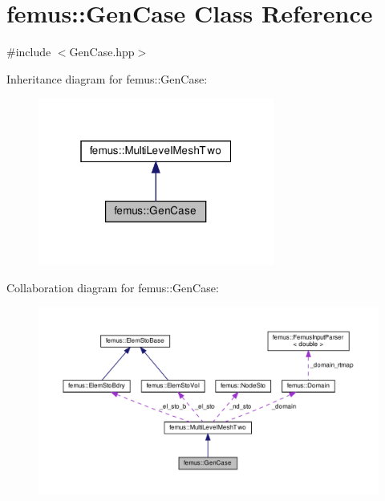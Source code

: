 \hypertarget{classfemus_1_1_gen_case}{}\section{femus\+:\+:Gen\+Case Class Reference}
\label{classfemus_1_1_gen_case}


{\ttfamily \#include $<$Gen\+Case.\+hpp$>$}



Inheritance diagram for femus\+:\+:Gen\+Case\+:
\nopagebreak
\begin{figure}[H]
\begin{center}
\leavevmode
\includegraphics[width=220pt]{classfemus_1_1_gen_case__inherit__graph}
\end{center}
\end{figure}


Collaboration diagram for femus\+:\+:Gen\+Case\+:
\nopagebreak
\begin{figure}[H]
\begin{center}
\leavevmode
\includegraphics[width=350pt]{classfemus_1_1_gen_case__coll__graph}
\end{center}
\end{figure}
